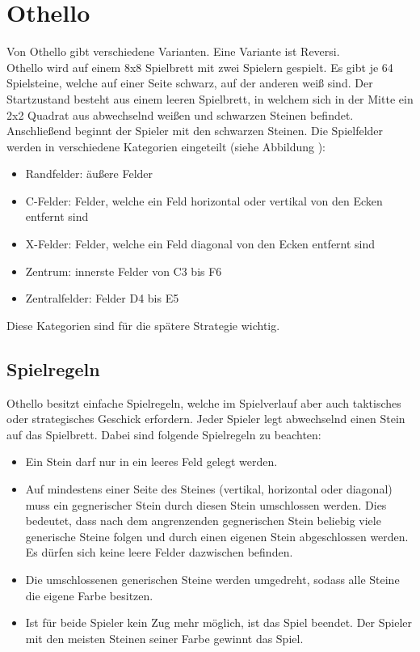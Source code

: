 \chapter{Othello}
\label{othello-chapter}
Von Othello gibt verschiedene Varianten. Eine Variante ist Reversi.
\\Othello wird auf einem 8x8 Spielbrett mit zwei Spielern gespielt. Es gibt je 64 Spielsteine, welche auf einer Seite schwarz, auf der anderen weiß sind. Der Startzustand besteht aus einem leeren Spielbrett, in welchem sich in der Mitte ein 2x2 Quadrat aus abwechselnd weißen und schwarzen Steinen befindet. Anschließend beginnt der Spieler mit den schwarzen Steinen.
Die Spielfelder werden in verschiedene Kategorien eingeteilt (siehe Abbildung
 ):
\begin{itemize}
\item Randfelder: äußere Felder
\item C-Felder: Felder, welche ein Feld horizontal oder vertikal von den Ecken entfernt sind
\item X-Felder: Felder, welche ein Feld diagonal von den Ecken entfernt sind
\item Zentrum: innerste Felder von C3 bis F6
\item Zentralfelder: Felder D4 bis E5
\end{itemize}
Diese Kategorien sind für die spätere Strategie wichtig.
\section{Spielregeln}
Othello besitzt einfache Spielregeln, welche im Spielverlauf aber auch taktisches oder strategisches Geschick erfordern. Jeder Spieler legt abwechselnd einen Stein auf das Spielbrett. Dabei sind folgende Spielregeln zu beachten:
\begin{itemize}
\item Ein Stein darf nur in ein leeres Feld gelegt werden.
\item Auf mindestens einer Seite des Steines (vertikal, horizontal oder diagonal) muss ein gegnerischer Stein durch diesen Stein umschlossen werden. Dies bedeutet, dass nach dem angrenzenden gegnerischen Stein beliebig viele generische Steine folgen und durch einen eigenen Stein abgeschlossen werden. Es dürfen sich keine leere Felder dazwischen befinden.
\item Die umschlossenen generischen Steine werden umgedreht, sodass alle Steine die eigene Farbe besitzen.
\item Ist für beide Spieler kein Zug mehr möglich, ist das Spiel beendet. Der Spieler mit den meisten Steinen seiner Farbe gewinnt das Spiel.
\end{itemize}

